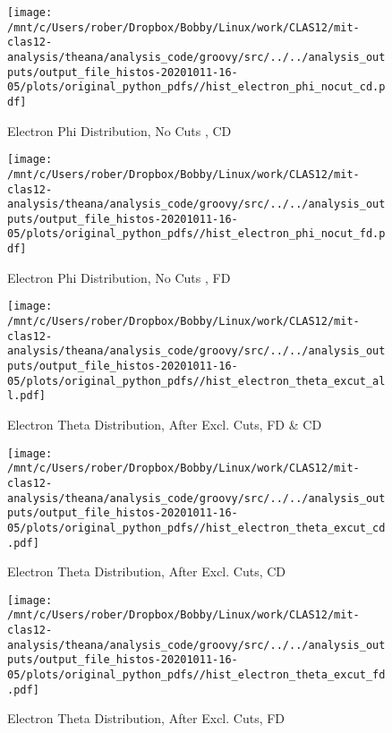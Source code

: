 \documentclass{article}
\begin{document}
\begin{landscape}
    \begin{figure}[h]
        \centering

        \texttt{[image: /mnt/c/Users/rober/Dropbox/Bobby/Linux/work/CLAS12/mit-clas12-analysis/theana/analysis\_code/groovy/src/../../analysis\_outputs/output\_file\_histos-20201011-16-05/plots/original\_python\_pdfs//hist\_electron\_phi\_nocut\_cd.pdf]}
        \captionsetup{textformat=empty,labelformat=blank}
        \caption{Electron Phi Distribution, No Cuts , CD}
    \end{figure}
    \clearpage
    
    \begin{figure}[h]
        \centering

        \texttt{[image: /mnt/c/Users/rober/Dropbox/Bobby/Linux/work/CLAS12/mit-clas12-analysis/theana/analysis\_code/groovy/src/../../analysis\_outputs/output\_file\_histos-20201011-16-05/plots/original\_python\_pdfs//hist\_electron\_phi\_nocut\_fd.pdf]}
        \captionsetup{textformat=empty,labelformat=blank}
        \caption{Electron Phi Distribution, No Cuts , FD}
    \end{figure}
    \clearpage
    
    \begin{figure}[h]
        \centering

        \texttt{[image: /mnt/c/Users/rober/Dropbox/Bobby/Linux/work/CLAS12/mit-clas12-analysis/theana/analysis\_code/groovy/src/../../analysis\_outputs/output\_file\_histos-20201011-16-05/plots/original\_python\_pdfs//hist\_electron\_theta\_excut\_all.pdf]}
        \captionsetup{textformat=empty,labelformat=blank}
        \caption{Electron Theta Distribution, After Excl. Cuts, FD \& CD}
    \end{figure}
    \clearpage
    
    \begin{figure}[h]
        \centering

        \texttt{[image: /mnt/c/Users/rober/Dropbox/Bobby/Linux/work/CLAS12/mit-clas12-analysis/theana/analysis\_code/groovy/src/../../analysis\_outputs/output\_file\_histos-20201011-16-05/plots/original\_python\_pdfs//hist\_electron\_theta\_excut\_cd.pdf]}
        \captionsetup{textformat=empty,labelformat=blank}
        \caption{Electron Theta Distribution, After Excl. Cuts, CD}
    \end{figure}
    \clearpage
    
    \begin{figure}[h]
        \centering

        \texttt{[image: /mnt/c/Users/rober/Dropbox/Bobby/Linux/work/CLAS12/mit-clas12-analysis/theana/analysis\_code/groovy/src/../../analysis\_outputs/output\_file\_histos-20201011-16-05/plots/original\_python\_pdfs//hist\_electron\_theta\_excut\_fd.pdf]}
        \captionsetup{textformat=empty,labelformat=blank}
        \caption{Electron Theta Distribution, After Excl. Cuts, FD}
    \end{figure}
    \clearpage
    

\end{landscape}
\end{document}
